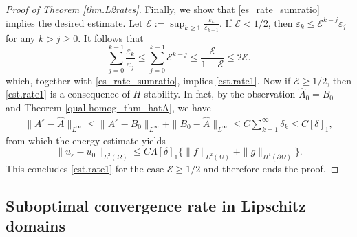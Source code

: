\documentclass[reqno,12pt]{amsart} %
\theoremstyle{definition}
\theoremstyle{remark}
\numberwithin{equation}{section}
\newcommand{\e}{\varepsilon}
\newcommand{\jz}[1]{\textcolor{red}{#1}}
\begin{document}
\begin{proof}[Proof of Theorem \ref{thm.L2rates}]
Finally, we show that \eqref{es_rate_sumratio} implies the desired estimate. Let $\mathcal{E}:= \sup_{k\geq 1}\frac{\varepsilon_k}{\varepsilon_{k-1}}$. If $\mathcal{E} < 1/2$, then $\e_k \le \mathcal{E}^{k-j} \e_j$ for any $k > j \ge 0$.
It follows that
\begin{equation*}
    \sum_{j=0}^{k-1} \frac{\e_k}{\e_j} \le \sum_{j=0}^{k-1} \mathcal{E}^{k - j} \le \frac{\mathcal{E}}{1 - \mathcal{E}} \le 2\mathcal{E}.
\end{equation*}
which, together with \eqref{es_rate_sumratio}, implies  \eqref{est.rate1}. Now if $\mathcal{E} \ge 1/2$, then \eqref{est.rate1} is a consequence of $H$-stability. In fact, by the observation $\widehat{A}_0 = B_0$ and Theorem \ref{qual-homog_thm_hatA}, we have
\begin{align*}
  \|A^\varepsilon-\widehat{A}\|_{L^\infty}\leq \|A^\varepsilon-B_0\|_{L^\infty}+\|B_0-\widehat{A}\|_{L^\infty}\leq C\sum_{k=1}^\infty \delta_k \le C[\delta]_1,
\end{align*}
from which the energy estimate yields
\begin{equation*}\label{conver_es_rate_energy}
    \|u_\varepsilon-u_0\|_{L^2(\Omega)} \leq C\Lambda [\delta]_1 \{\|f\|_{L^2(\Omega)}+\|g\|_{H^{1}(\partial\Omega)}\}.
\end{equation*}
This concludes \eqref{est.rate1} for the case $\mathcal{E} \ge 1/2$ and therefore ends the proof.
\end{proof}

\subsection{Suboptimal convergence rate in Lipschitz domains}
\end{document}
